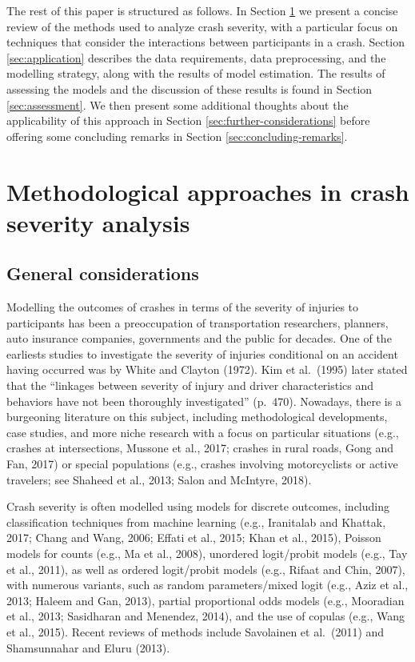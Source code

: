 \documentclass[]{elsarticle} %
\begin{document}
The rest of this paper is structured as follows. In Section
\ref{sec:review-of-methods} we present a concise review of the methods
used to analyze crash severity, with a particular focus on techniques
that consider the interactions between participants in a crash. Section
\ref{sec:application} describes the data requirements, data
preprocessing, and the modelling strategy, along with the results of
model estimation. The results of assessing the models and the discussion
of these results is found in Section \ref{sec:assessment}. We then
present some additional thoughts about the applicability of this
approach in Section \ref{sec:further-considerations} before offering
some concluding remarks in Section \ref{sec:concluding-remarks}.

\hypertarget{sec:review-of-methods}{%
\section{Methodological approaches in crash severity
analysis}\label{sec:review-of-methods}}

\hypertarget{general-considerations}{%
\subsection{General considerations}\label{general-considerations}}

Modelling the outcomes of crashes in terms of the severity of injuries
to participants has been a preoccupation of transportation researchers,
planners, auto insurance companies, governments and the public for
decades. One of the earliests studies to investigate the severity of
injuries conditional on an accident having occurred was by White and
Clayton (1972). Kim et al.~(1995) later stated that the ``linkages
between severity of injury and driver characteristics and behaviors have
not been thoroughly investigated'' (p.~470). Nowadays, there is a
burgeoning literature on this subject, including methodological
developments, case studies, and more niche research with a focus on
particular situations (e.g., crashes at intersections, Mussone et al.,
2017; crashes in rural roads, Gong and Fan, 2017) or special populations
(e.g., crashes involving motorcyclists or active travelers; see Shaheed
et al., 2013; Salon and McIntyre, 2018).

Crash severity is often modelled using models for discrete outcomes,
including classification techniques from machine learning (e.g.,
Iranitalab and Khattak, 2017; Chang and Wang, 2006; Effati et al., 2015;
Khan et al., 2015), Poisson models for counts (e.g., Ma et al., 2008),
unordered logit/probit models (e.g., Tay et al., 2011), as well as
ordered logit/probit models (e.g., Rifaat and Chin, 2007), with numerous
variants, such as random parameters/mixed logit (e.g., Aziz et al.,
2013; Haleem and Gan, 2013), partial proportional odds models (e.g.,
Mooradian et al., 2013; Sasidharan and Menendez, 2014), and the use of
copulas (e.g., Wang et al., 2015). Recent reviews of methods include
Savolainen et al.~(2011) and Shamsunnahar and Eluru (2013).
\end{document}

